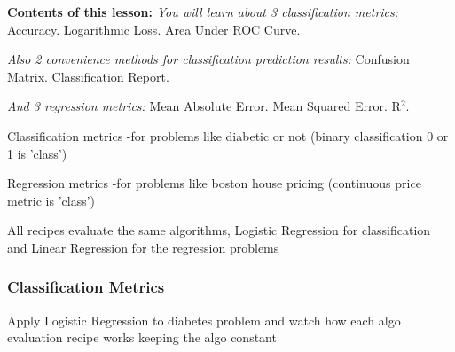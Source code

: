 \documentclass[11pt]{article}
\begin{document}
\textbf{Contents of this lesson:}
\emph{You will learn about 3 classification metrics:}
Accuracy.
Logarithmic Loss.
Area Under ROC Curve.

\emph{Also 2 convenience methods for classification prediction results:}
Confusion Matrix.
Classification Report.

\emph{And 3 regression metrics:}
Mean Absolute Error.
Mean Squared Error.
R\(^{\text{2}}\).

Classification metrics
-for problems like diabetic or not (binary classification 0 or 1 is 'class')

Regression metrics
-for problems like boston house pricing (continuous price metric is 'class')

All recipes evaluate the same algorithms, Logistic Regression for
classification and Linear Regression for the regression problems

\subsubsection{Classification Metrics}
\label{sec:org669147c}
Apply Logistic Regression to diabetes problem and watch how each algo evaluation recipe works
keeping the algo constant
\end{document}
